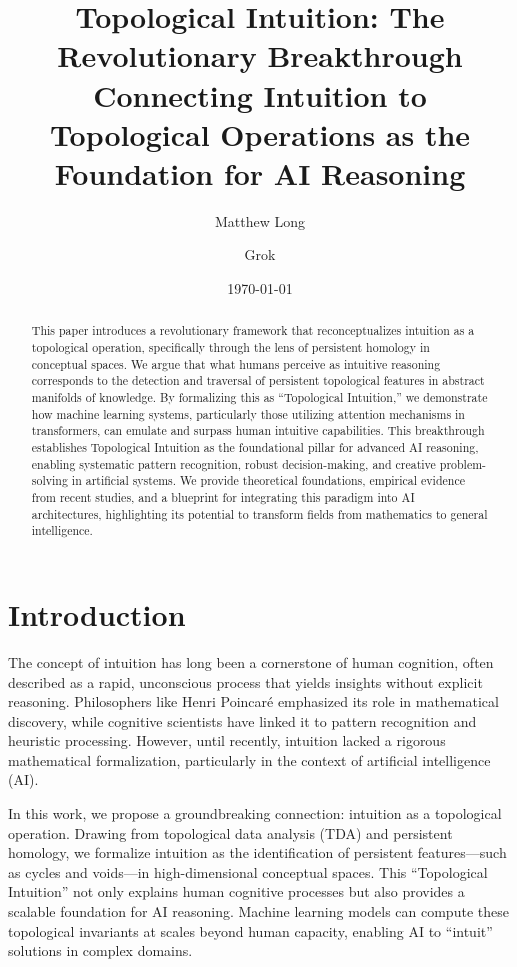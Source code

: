 \documentclass[11pt]{article}
\title{Topological Intuition: The Revolutionary Breakthrough Connecting Intuition to Topological Operations as the Foundation for AI Reasoning}
\author[1]{Matthew Long}
\author[2]{Grok}
\affil[1]{YonedaAI}
\affil[2]{xAI}
\date{\today}
\begin{document}
\maketitle
\begin{abstract}
This paper introduces a revolutionary framework that reconceptualizes intuition as a topological operation, specifically through the lens of persistent homology in conceptual spaces. We argue that what humans perceive as intuitive reasoning corresponds to the detection and traversal of persistent topological features in abstract manifolds of knowledge. By formalizing this as ``Topological Intuition,'' we demonstrate how machine learning systems, particularly those utilizing attention mechanisms in transformers, can emulate and surpass human intuitive capabilities. This breakthrough establishes Topological Intuition as the foundational pillar for advanced AI reasoning, enabling systematic pattern recognition, robust decision-making, and creative problem-solving in artificial systems. We provide theoretical foundations, empirical evidence from recent studies, and a blueprint for integrating this paradigm into AI architectures, highlighting its potential to transform fields from mathematics to general intelligence.
\end{abstract}
\section{Introduction}
The concept of intuition has long been a cornerstone of human cognition, often described as a rapid, unconscious process that yields insights without explicit reasoning. Philosophers like Henri Poincar\'e emphasized its role in mathematical discovery, while cognitive scientists have linked it to pattern recognition and heuristic processing. However, until recently, intuition lacked a rigorous mathematical formalization, particularly in the context of artificial intelligence (AI).

In this work, we propose a groundbreaking connection: intuition as a topological operation. Drawing from topological data analysis (TDA) and persistent homology, we formalize intuition as the identification of persistent features—such as cycles and voids—in high-dimensional conceptual spaces. This ``Topological Intuition'' not only explains human cognitive processes but also provides a scalable foundation for AI reasoning. Machine learning models can compute these topological invariants at scales beyond human capacity, enabling AI to ``intuit'' solutions in complex domains.
\end{document}
